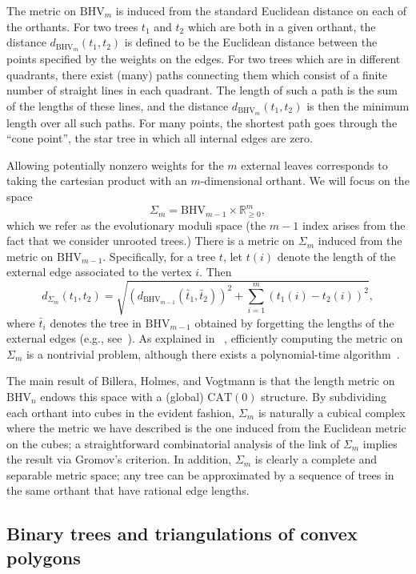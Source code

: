 \documentclass[a4paper,11pt]{article}
\newcommand{\CAT}{\textrm{CAT}}
\newcommand{\BHV}{\textrm{BHV}}
\begin{document}
The metric on $\BHV_{m}$ is induced from the standard Euclidean distance on each of the orthants.
For two trees $t_1$ and $t_2$ which are both in a given orthant, the distance $d_{\BHV_{m}}(t_1,t_2)$ is defined to be the Euclidean distance between the points specified by the weights on the edges.
For two trees which are in different quadrants, there exist (many) paths connecting them which consist of a finite number of straight lines in each quadrant.
The length of such a path is the sum of the lengths of these lines, and the distance $d_{\BHV_{m}}(t_1,t_2)$ is then the minimum length over all such
paths.
For many points, the shortest path goes through the ``cone point'', the star tree in which all internal edges are zero.

Allowing potentially nonzero weights for the $m$ external leaves corresponds to taking the cartesian product with an $m$-dimensional orthant.
We will focus on the space \[\Sigma_m = \BHV_{m-1} \times \mathbb{R}^m_{\geq 0},\] which we refer as the evolutionary moduli space (the $m-1$ index
arises from the fact that we consider unrooted trees.)
There is a metric on $\Sigma_m$ induced from the metric on $\BHV_{m-1}$.
Specifically, for a tree $t$, let $t(i)$ denote the length of the external edge associated to the vertex $i$.
Then \[d_{\Sigma_m}(t_1,t_2) =
\sqrt{\left(d_{\BHV_{m-1}}(\bar{t}_1,\bar{t}_2)\right)^2 + \sum_{i=1}^m (t_1(i) -
  t_2(i))^2},\] where $\bar{t}_i$ denotes the tree in $\BHV_{m-1}$
obtained by forgetting the lengths of the external edges (e.g.,
see~\cite{owen2011fast}).
As explained in ~\cite[\S4.2]{billera2001geometry}, efficiently computing the metric on $\Sigma_m$ is a nontrivial problem, although there exists a polynomial-time algorithm~\cite{owen2011fast}.

The main result of Billera, Holmes, and Vogtmann is that the length metric on $\BHV_n$ endows this space with a (global) $\CAT(0)$ structure.
By subdividing each orthant into cubes in the evident fashion, $\Sigma_m$ is naturally a cubical complex where the metric we have described is the one induced from the Euclidean metric on the cubes; a straightforward combinatorial analysis of the link of $\Sigma_m$ implies the result via Gromov's criterion.
In addition, $\Sigma_m$ is clearly a complete and separable metric space; any tree can be approximated by a sequence of trees in the same orthant that have rational edge lengths.

\iffalse
\subsection{Binary trees and triangulations of convex polygons}
\end{document}
